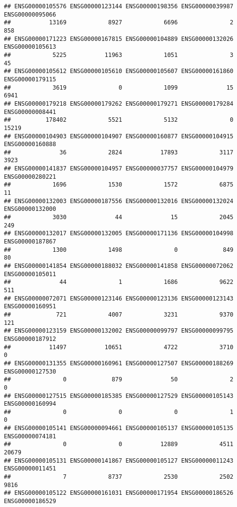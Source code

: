 \documentclass[
]{article}
\begin{document}
\begin{verbatim}
## ENSG00000105576 ENSG00000123144 ENSG00000198356 ENSG00000039987 ENSG00000095066 
##           13169            8927            6696               2             858 
## ENSG00000171223 ENSG00000167815 ENSG00000104889 ENSG00000132026 ENSG00000105613 
##            5225           11963            1051               3              45 
## ENSG00000105612 ENSG00000105610 ENSG00000105607 ENSG00000161860 ENSG00000179115 
##            3619               0            1099              15            6941 
## ENSG00000179218 ENSG00000179262 ENSG00000179271 ENSG00000179284 ENSG00000008441 
##          178402            5521            5132               0           15219 
## ENSG00000104903 ENSG00000104907 ENSG00000160877 ENSG00000104915 ENSG00000160888 
##              36            2824           17893            3117            3923 
## ENSG00000141837 ENSG00000104957 ENSG00000037757 ENSG00000104979 ENSG00000280221 
##            1696            1530            1572            6875              11 
## ENSG00000132003 ENSG00000187556 ENSG00000132016 ENSG00000132024 ENSG00000132000 
##            3030              44              15            2045             249 
## ENSG00000132017 ENSG00000132005 ENSG00000171136 ENSG00000104998 ENSG00000187867 
##            1300            1498               0             849              80 
## ENSG00000141854 ENSG00000188032 ENSG00000141858 ENSG00000072062 ENSG00000105011 
##              44               1            1686            9622             511 
## ENSG00000072071 ENSG00000123146 ENSG00000123136 ENSG00000123143 ENSG00000160951 
##             721            4007            3231            9370             121 
## ENSG00000123159 ENSG00000132002 ENSG00000099797 ENSG00000099795 ENSG00000187912 
##           11497           10651            4722            3710               0 
## ENSG00000131355 ENSG00000160961 ENSG00000127507 ENSG00000188269 ENSG00000127530 
##               0             879              50               2               0 
## ENSG00000127515 ENSG00000185385 ENSG00000127529 ENSG00000105143 ENSG00000160994 
##               0               0               0               1               0 
## ENSG00000105141 ENSG00000094661 ENSG00000105137 ENSG00000105135 ENSG00000074181 
##               0               0           12889            4511           20679 
## ENSG00000105131 ENSG00000141867 ENSG00000105127 ENSG00000011243 ENSG00000011451 
##               7            8737            2530            2502            9816 
## ENSG00000105122 ENSG00000161031 ENSG00000171954 ENSG00000186526 ENSG00000186529 

\end{verbatim}
\end{document}
